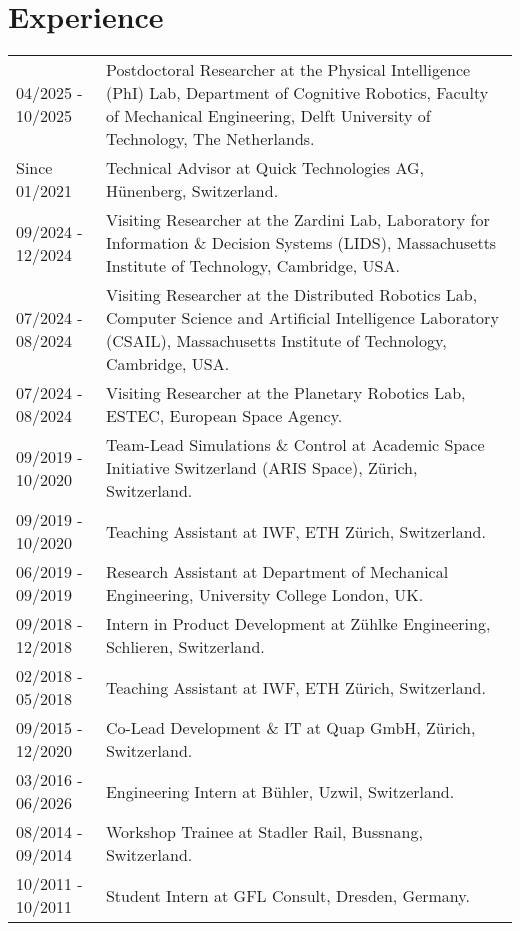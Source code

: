 \pagebreak

\section*{Experience}
\noindent
\begin{longtable}{p{} p{}}
    04/2025 - 10/2025 & Postdoctoral Researcher at the Physical Intelligence (PhI) Lab, Department of Cognitive Robotics, Faculty of Mechanical Engineering, Delft University of Technology, The Netherlands.\\
    Since 01/2021 & Technical Advisor at Quick Technologies AG, Hünenberg, Switzerland.\\
    09/2024 - 12/2024 & Visiting Researcher at the Zardini Lab, Laboratory for Information \& Decision Systems (LIDS), Massachusetts Institute of Technology, Cambridge, USA.\\
    07/2024 - 08/2024 & Visiting Researcher at the Distributed Robotics Lab, Computer Science and Artificial Intelligence Laboratory (CSAIL), Massachusetts Institute of Technology, Cambridge, USA.\\
    07/2024 - 08/2024 & Visiting Researcher at the Planetary Robotics Lab, ESTEC, European Space Agency.\\
    09/2019 - 10/2020 & Team-Lead Simulations \& Control at Academic Space Initiative Switzerland (ARIS Space), Zürich, Switzerland.\\
    09/2019 - 10/2020 & Teaching Assistant at IWF, ETH Zürich, Switzerland.\\
    06/2019 - 09/2019 & Research Assistant at Department of Mechanical Engineering, University College London, UK.\\
    09/2018 - 12/2018 & Intern in Product Development at Zühlke Engineering, Schlieren, Switzerland.\\
    02/2018 - 05/2018 & Teaching Assistant at IWF, ETH Zürich, Switzerland.\\
    09/2015 - 12/2020 & Co-Lead Development \& IT at Quap GmbH, Zürich, Switzerland.\\
    03/2016 - 06/2026 & Engineering Intern at Bühler, Uzwil, Switzerland.\\
    08/2014 - 09/2014 & Workshop Trainee at Stadler Rail, Bussnang, Switzerland.\\
    10/2011 - 10/2011 & Student Intern at GFL Consult, Dresden, Germany.
\end{longtable}

